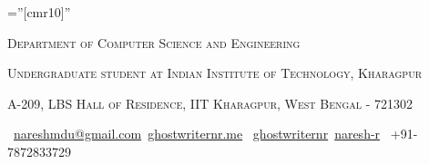 \documentclass[a4paper,10pt]{extarticle} %
\begin{document}
\pagestyle{empty} %

\font\fb=''[cmr10]'' %


\par{\par} %
\par{\centering\large {\textsc{Department of Computer Science and Engineering}}\par}\large
\par{\centering\large {\textsc{Undergraduate student at Indian Institute of Technology, Kharagpur}}\par}\large
\par{\centering\large {\textsc{A-209, LBS Hall of Residence, IIT Kharagpur, West Bengal - 721302}}\par}\large
\hspace{1cm}\normalsize \faEnvelope\ {\href{mailto:nareshmdu@gmail.com}{nareshmdu@gmail.com}}\hfill \normalsize  \faGlobe\ {\href{http://ghostwriternr.me/}{ghostwriternr.me}} \hfill \normalsize \faGithub\ {\href{https://github.com/ghostwriternr}{ghostwriternr}}\hfill \normalsize  \faLinkedinSquare\ {\href{https://www.linkedin.com/in/naresh-r-464a8b8b}{naresh-r}} \hfill {\faPhone\ +91-7872833729} \hspace{1cm}



\end{document}
